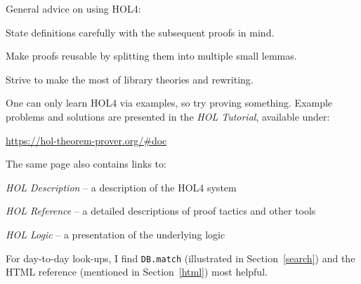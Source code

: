 \documentclass[a4paper,10pt]{article}
\begin{document}
General advice on using HOL4:
\begin{enum}
\item State definitions carefully with the subsequent proofs in mind.
\item Make proofs reusable by splitting them into multiple small lemmas.
\item Strive to make the most of library theories and rewriting.
\end{enum}
One can only learn HOL4 via examples, so try proving something.
Example problems and solutions are presented in the \emph{HOL
  Tutorial}, available under:
\begin{center}
\url{https://hol-theorem-prover.org/#doc}
\end{center}
The same page also contains links to:
\begin{enum}
\item[~]\emph{HOL Description} -- a description of the HOL4 system
\item[~]\emph{HOL Reference} -- a detailed descriptions of proof tactics and other tools
\item[~]\emph{HOL Logic} -- a presentation of the underlying logic
\end{enum}
For day-to-day look-ups, I find {\tt DB.match} (illustrated in
Section~\ref{search}) and the HTML reference (mentioned in
Section~\ref{html}) most helpful.
\end{document}
